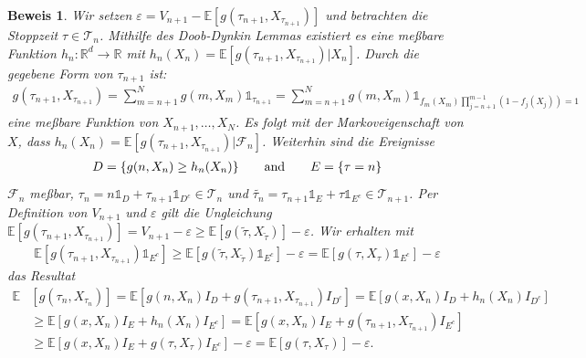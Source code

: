 \documentclass[12pt,titlepage,headsepline]{article}
\newtheorem*{beweis-non}{Beweis}
\begin{document}
      \begin{beweis-non}\label{appendix:becker_beweis_iterative_convergence}
        \textup{
        Wir setzen $\varepsilon = V_{n+1}-\mathbb{E}[g(\tau_{n+1},X_{\tau_{n+1}})]$ und betrachten die Stoppzeit $\tau \in \mathcal{T}_n$. Mithilfe des Doob-Dynkin Lemmas \cite{aliprantis_infinite_2006, Theorem 4.41} existiert es eine meßbare Funktion $h_n : \mathbb{R}^d \rightarrow \mathbb{R}$ mit $ h_n(X_n)=\mathbb{E}[g(\tau_{n+1},X_{\tau_{n+1}})\lvert X_n] $. Durch die gegebene Form von $\tau_{n+1}$ ist:
        \begin{align*}
          g(\tau_{n+1},X_{\tau_{n+1}}) = \sum_{m=n+1}^{N}g(m,X_m)\mathds{1}_{\tau_{n+1}} = \sum_{m=n+1}^{N}g(m,X_m)\mathds{1}_{f_m(X_m)\prod_{j=n+1}^{m-1}(1-f_j(X_j))=1}
        \end{align*}
        eine meßbare Funktion von $X_{n+1},\ldots,X_N$. Es folgt mit der Markoveigenschaft von $X$, dass $h_n(X_n)=\mathbb{E}[g(\tau_{n+1},X_{\tau_{n+1}})\lvert \mathcal{F}_n]$.
        Weiterhin sind die Ereignisse
        \begin{align*}
          D = \{ g(n,X_n) \geq h_n(X_n)\} \qquad \textup{and} \qquad E = \{\tau = n\}
        \end{align*}
        $\mathcal{F}_n$ meßbar, $\tau_n = n \mathds{1}_D + \tau_{n+1}\mathds{1}_{D^c} \in \mathcal{T}_n$ und $ \tilde{\tau_n}=  \tau_{n+1}\mathds{1}_E + \tau\mathds{1}_{E^c} \in \mathcal{T}_{n+1}$. Per Definition von $V_{n+1}$ und $\varepsilon$ gilt die Ungleichung $\mathbb{E}[g(\tau_{n+1},X_{\tau_{n+1}})] = V_{n+1} - \varepsilon \geq \mathbb{E}[g(\tilde{\tau},X_{\tilde{\tau}})] - \varepsilon$. Wir erhalten mit
        \begin{align*}
          \mathbb{E}[g(\tau_{n+1},X_{\tau_{n+1}})\mathds{1}_{E^c}] \geq \mathbb{E}[g(\tilde{\tau},X_{\tilde{\tau}})\mathds{1}_{E^c}] - \varepsilon = \mathbb{E}[g(\tau,X_{\tau})\mathds{1}_{E^c}] - \varepsilon
        \end{align*}
        das Resultat
        \begin{align*}
          \mathbb{E} & [g(\tau_n,X_{\tau_n})] = \mathbb{E}[g(n,X_n)I_D + g(\tau_{n+1},X_{\tau_{n+1}})I_{D^c}]=\mathbb{E}[g(x,X_n)I_D + h_n(X_n)I_{D^c}] \\
          & \geq \mathbb{E}[g(x,X_n)I_E + h_n(X_n)I_{E^c}] = \mathbb{E}[g(x,X_n)I_E + g(\tau_{n+1},X_{\tau_{n+1}})I_{E^c}] \\
          & \geq \mathbb{E}[g(x,X_n)I_E + g(\tau,X_{\tau})I_{E^c}] - \varepsilon = \mathbb{E}[g(\tau,X_{\tau})] - \varepsilon.
        \end{align*}
}
\end{beweis-non}
\end{document}

